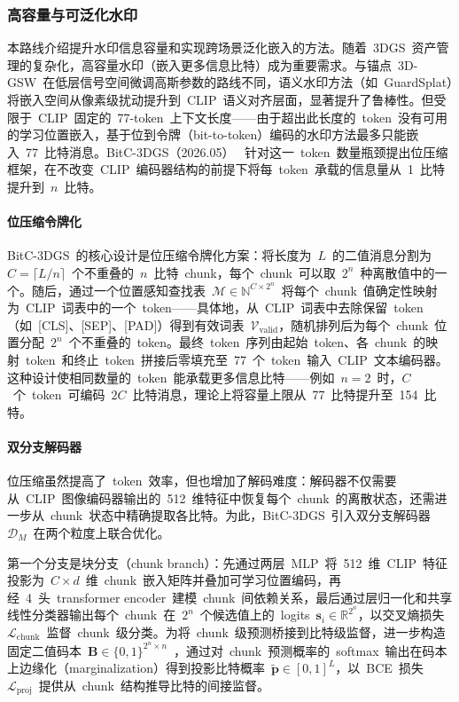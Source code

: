 \subsubsection{高容量与可泛化水印}

本路线介绍提升水印信息容量和实现跨场景泛化嵌入的方法。随着~3DGS~资产管理的复杂化，高容量水印（嵌入更多信息比特）成为重要需求。与锚点~3D-GSW~在低层信号空间微调高斯参数的路线不同，语义水印方法（如~GuardSplat）将嵌入空间从像素级扰动提升到~CLIP~语义对齐层面，显著提升了鲁棒性。但受限于~CLIP~固定的~77-token~上下文长度——由于超出此长度的~token~没有可用的学习位置嵌入，基于位到令牌（bit-to-token）编码的水印方法最多只能嵌入~77~比特消息。BitC-3DGS（2026.05）~\cite{2605_29583} 针对这一~token~数量瓶颈提出位压缩框架，在不改变~CLIP~编码器结构的前提下将每~token~承载的信息量从~1~比特提升到~$n$~比特。

\paragraph{位压缩令牌化}
BitC-3DGS~的核心设计是位压缩令牌化方案：将长度为~$L$~的二值消息分割为~$C = \lceil L/n \rceil$~个不重叠的~$n$~比特~chunk，每个~chunk~可以取~$2^n$~种离散值中的一个。随后，通过一个位置感知查找表~$\mathcal{M} \in \mathbb{N}^{C \times 2^n}$~将每个~chunk~值确定性映射为~CLIP~词表中的一个~token——具体地，从~CLIP~词表中去除保留~token（如~[CLS]、[SEP]、[PAD]）得到有效词表~$\mathcal{V}_{\mathrm{valid}}$，随机排列后为每个~chunk~位置分配~$2^n$~个不重叠的~token。最终~token~序列由起始~token、各~chunk~的映射~token~和终止~token~拼接后零填充至~77~个~token~输入~CLIP~文本编码器。这种设计使相同数量的~token~能承载更多信息比特——例如~$n=2$~时，$C$~个~token~可编码~$2C$~比特消息，理论上将容量上限从~77~比特提升至~154~比特。

\paragraph{双分支解码器}
位压缩虽然提高了~token~效率，但也增加了解码难度：解码器不仅需要从~CLIP~图像编码器输出的~512~维特征中恢复每个~chunk~的离散状态，还需进一步从~chunk~状态中精确提取各比特。为此，BitC-3DGS~引入双分支解码器~$\mathcal{D}_M$~在两个粒度上联合优化。

第一个分支是块分支（chunk branch）：先通过两层~MLP~将~512~维~CLIP~特征投影为~$C \times d$~维~chunk~嵌入矩阵并叠加可学习位置编码，再经~4~头~transformer encoder~建模~chunk~间依赖关系，最后通过层归一化和共享线性分类器输出每个~chunk~在~$2^n$~个候选值上的~logits~$\bm{s}_i \in \mathbb{R}^{2^n}$，以交叉熵损失~$\mathcal{L}_{\mathrm{chunk}}$~监督~chunk~级分类。为将~chunk~级预测桥接到比特级监督，进一步构造固定二值码本~$\mathbf{B} \in \{0,1\}^{2^n \times n}$~，通过对~chunk~预测概率的~softmax~输出在码本上边缘化（marginalization）得到投影比特概率~$\tilde{\bm{p}} \in [0,1]^L$，以~BCE~损失~$\mathcal{L}_{\mathrm{proj}}$~提供从~chunk~结构推导比特的间接监督。

